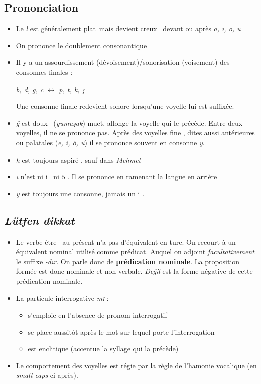 \documentclass{cours}
\newcommand{\ch}{\c{s}}
\newcommand{\ug}{\u{g}}
\newcommand{\sci}{\textsc{i}}
\begin{document}
\subsection{Prononciation}
\begin{itemize}
    \item Le \textsl{l} est généralement \og plat\fg\ mais devient \og creux \fg\ devant ou après \textsl{a, \i, o, u}
    \item On prononce le doublement consonantique
    \item Il y a un assourdissement (dévoisement)/sonorisation (voisement) des consonnes finales :
          \begin{center}
              \textsl{b, d, g, c} $\leftrightarrow$ \textsl{p, t, k, ç}
          \end{center}
          Une consonne finale redevient sonore lorsqu'une voyelle lui est suffixée.
    \item \textsl{\ug} est \og doux \fg\ (\textsl{yumu\ch ak}) muet, allonge la voyelle qui le précède. Entre deux voyelles, il ne se prononce pas. Après des voyelles \og fine \fg, dites aussi antérieures ou palatales (\textsl{e, i, ö, ü}) il se prononce souvent en consonne \textsl{y}.
    \item \textsl{h} est toujours \og aspiré \fg, sauf dans \textsl{Mehmet}
    \item \textsl{\i} n'est ni \og i \fg\ ni \og ö \fg. Il se prononce en ramenant la langue en arrière
    \item \textsl{y} est toujours une consonne, jamais un \og i \fg.
\end{itemize}

\subsection{\textsl{Lütfen dikkat}}
\begin{itemize}
    \item Le verbe \og être \fg\ au présent n'a pas d'équivalent en turc. On recourt à un équivalent nominal utilisé comme prédicat. Auquel on adjoint \emph{facultativement} le suffixe \textsl{-d\i r}. On parle donc de {\bf prédication nominale}. La proposition formée est donc nominale et non verbale. \textsl{De\ug il} est la forme négative de cette prédication nominale.
    \item La particule interrogative \textsl{m\sci} :
          \begin{itemize}
              \item s'emploie en l'absence de pronom interrogatif
              \item se place aussitôt après le mot sur lequel porte l'interrogation
              \item est enclitique (accentue la syllage qui la précède)
          \end{itemize}
    \item Le comportement des voyelles est régie par la règle de l'hamonie vocalique (en \textsl{small caps} ci-après).
\end{itemize}
\end{document}
